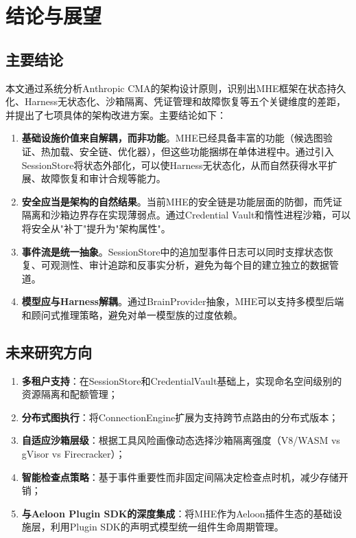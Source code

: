 \documentclass[12pt,a4paper]{ctexart}
\begin{document}
\section{结论与展望}\label{sec:conclusion}

\subsection{主要结论}

本文通过系统分析Anthropic CMA的架构设计原则，识别出MHE框架在状态持久化、Harness无状态化、沙箱隔离、凭证管理和故障恢复等五个关键维度的差距，并提出了七项具体的架构改进方案。主要结论如下：

\begin{enumerate}
    \item \textbf{基础设施价值来自解耦，而非功能}。MHE已经具备丰富的功能（候选图验证、热加载、安全链、优化器），但这些功能捆绑在单体进程中。通过引入SessionStore将状态外部化，可以使Harness无状态化，从而自然获得水平扩展、故障恢复和审计合规等能力。

    \item \textbf{安全应当是架构的自然结果}。当前MHE的安全链是功能层面的防御，而凭证隔离和沙箱边界存在实现薄弱点。通过Credential Vault和惰性进程沙箱，可以将安全从"补丁"提升为"架构属性"。

    \item \textbf{事件流是统一抽象}。SessionStore中的追加型事件日志可以同时支撑状态恢复、可观测性、审计追踪和反事实分析，避免为每个目的建立独立的数据管道。

    \item \textbf{模型应与Harness解耦}。通过BrainProvider抽象，MHE可以支持多模型后端和顾问式推理策略，避免对单一模型族的过度依赖。
\end{enumerate}

\subsection{未来研究方向}

\begin{enumerate}
    \item \textbf{多租户支持}：在SessionStore和CredentialVault基础上，实现命名空间级别的资源隔离和配额管理；
    \item \textbf{分布式图执行}：将ConnectionEngine扩展为支持跨节点路由的分布式版本；
    \item \textbf{自适应沙箱层级}：根据工具风险画像动态选择沙箱隔离强度（V8/WASM vs gVisor vs Firecracker）；
    \item \textbf{智能检查点策略}：基于事件重要性而非固定间隔决定检查点时机，减少存储开销；
    \item \textbf{与Aeloon Plugin SDK的深度集成}：将MHE作为Aeloon插件生态的基础设施层，利用Plugin SDK的声明式模型统一组件生命周期管理。
\end{enumerate}
\end{document}
